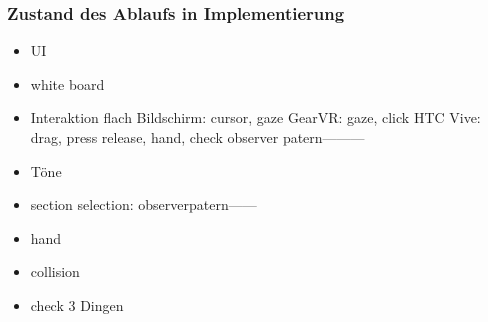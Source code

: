   \subsubsection{Zustand des Ablaufs in Implementierung}
  
\begin{itemize}
\item UI
\item white board
\item Interaktion
\subitem flach Bildschirm: cursor, gaze
\subitem GearVR: gaze, click
\subitem HTC Vive: drag, press release, hand, check
\subitem observer patern---------
\item Töne
\item section selection: observerpatern------
\item hand
\item collision
\item check 3 Dingen
\end{itemize}